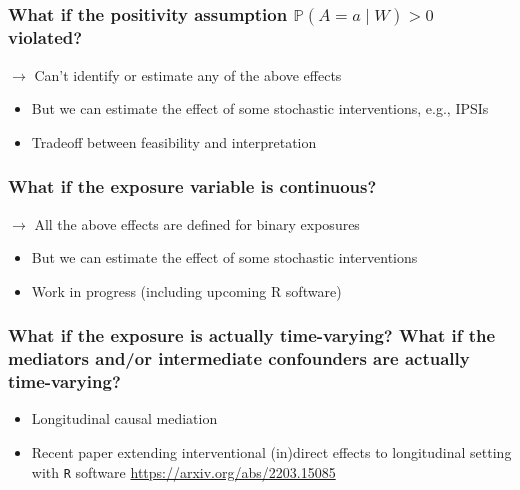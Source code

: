 \documentclass[
  12pt,
]{book}
\newcommand{\passthrough}[1]{#1}
\providecommand{\tightlist}{%
  \setlength{\itemsep}{0pt}\setlength{\parskip}{0pt}}
\theoremstyle{definition}
\theoremstyle{definition}
\theoremstyle{definition}
\renewcommand{\P}{\mathbb{P}}
\newcommand{\1}{\mathbbm{1}}
\begin{document}
\hypertarget{what-if-the-positivity-assumption-paamid-w0-violated}{%
\subsubsection*{\texorpdfstring{What if the positivity assumption \(\P(A=a\mid W)>0\) violated?}{What if the positivity assumption \textbackslash P(A=a\textbackslash mid W)\textgreater0 violated?}}\label{what-if-the-positivity-assumption-paamid-w0-violated}}


\(\rightarrow\) Can't identify or estimate any of the above effects

\begin{itemize}
\tightlist
\item
  But we can estimate the effect of some stochastic interventions, e.g., IPSIs
\item
  Tradeoff between feasibility and interpretation
\end{itemize}

\hypertarget{what-if-the-exposure-variable-is-continuous}{%
\subsubsection*{What if the exposure variable is continuous?}\label{what-if-the-exposure-variable-is-continuous}}


\(\rightarrow\) All the above effects are defined for binary exposures

\begin{itemize}
\tightlist
\item
  But we can estimate the effect of some stochastic interventions
\item
  Work in progress (including upcoming R software)
\end{itemize}

\hypertarget{what-if-the-exposure-is-actually-time-varying-what-if-the-mediators-andor-intermediate-confounders-are-actually-time-varying}{%
\subsubsection*{What if the exposure is actually time-varying? What if the mediators and/or intermediate confounders are actually time-varying?}\label{what-if-the-exposure-is-actually-time-varying-what-if-the-mediators-andor-intermediate-confounders-are-actually-time-varying}}


\begin{itemize}
\tightlist
\item
  Longitudinal causal mediation
\item
  Recent paper extending interventional (in)direct effects to longitudinal
  setting with \passthrough{\lstinline!R!} software \url{https://arxiv.org/abs/2203.15085}
\end{itemize}
\end{document}
